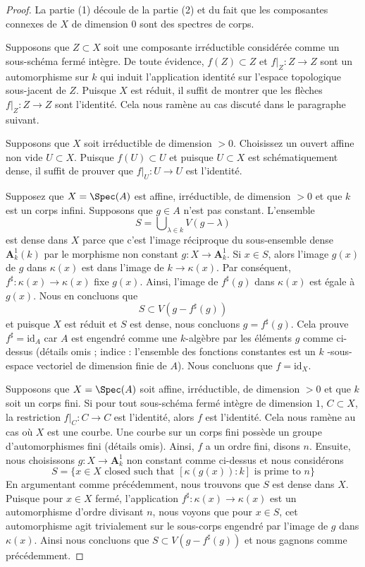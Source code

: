 \begin{proof}
La partie (1) découle de la partie (2) et du fait que les
composantes connexes de $X$ de dimension $0$ sont des spectres de corps.

\medskip\noindent
Supposons que $Z \subset X$ soit une composante irréductible considérée
comme un sous-schéma fermé intègre. De toute évidence, $f(Z) \subset Z$
et $f|_Z : Z \to Z$ sont un automorphisme sur $k$ qui induit
l'application identité sur l'espace topologique sous-jacent de $Z$.
Puisque $X$ est réduit, il suffit de montrer que les flèches $f|_Z : Z \to Z$
sont l'identité. Cela nous ramène au cas discuté dans le paragraphe suivant.

\medskip\noindent
Supposons que $X$ soit irréductible de dimension $> 0$.
Choisissez un ouvert affine non vide $U \subset X$. Puisque
$f(U) \subset U$ et puisque $U \subset X$ est schématiquement
dense, il suffit de prouver que $f|_U : U \to U$ est l'identité.

\medskip\noindent
Supposez que $X = \Spec(A)$ est affine, irréductible, de dimension $> 0$ et que
$k$ est un corps infini. Supposons que $g \in A$ n'est pas constant. L'ensemble
$$
S = \bigcup\nolimits_{\lambda \in k} V(g - \lambda)
$$
est dense dans $X$ parce que c'est l'image réciproque du
sous-ensemble dense $\mathbf{A}^1_k(k)$ par le morphisme
non constant $g : X \to \mathbf{A}^1_k$. Si $x \in S$,
alors l'image $g(x)$ de $g$ dans $\kappa(x)$ est dans
l'image de $k \to \kappa(x)$. Par conséquent, $f^\sharp :
\kappa(x) \to \kappa(x)$ fixe $g(x)$. Ainsi, l'image de
$f^\sharp(g)$ dans $\kappa(x)$ est égale à $g(x)$. Nous en concluons que
$$
S \subset V(g - f^\sharp(g))
$$
et puisque $X$ est réduit et $S$ est dense, nous concluons
$g=f^\sharp(g)$. Cela prouve $f^\sharp = \text{id}_A$ car $A$ est
engendré comme une $k$-algèbre par les éléments $g$ comme ci-dessus (détails
omis ; indice : l'ensemble des fonctions constantes est un $k$ -sous-espace
vectoriel de dimension finie de $A$). Nous concluons que $f = \text{id}_X$.

\medskip\noindent
Supposons que $X = \Spec(A)$ soit affine, irréductible, de
dimension $> 0$ et que $k$ soit un corps fini. Si pour tout
sous-schéma fermé intègre de dimension $1$, $C \subset X$, la
restriction $f|_C : C \to C$ est l'identité, alors $f$ est
l'identité. Cela nous ramène au cas où $X$ est une courbe. Une courbe
sur un corps fini possède un groupe d'automorphismes fini (détails
omis). Ainsi, $f$ a un ordre fini, disons $n$. Ensuite, nous choisissons
$g : X \to \mathbf{A}^1_k$ non constant comme ci-dessus et nous considérons
$$
S = \{x \in X\text{ closed such that }[\kappa(g(x)) : k]
\text{ is prime to }n\}
$$
En argumentant comme précédemment, nous trouvons que
$S$ est dense dans $X$. Puisque pour $x \in X$ fermé,
l'application $f^\sharp : \kappa(x) \to \kappa(x)$
est un automorphisme d'ordre divisant $n$, nous
voyons que pour $x \in S$, cet automorphisme agit
trivialement sur le sous-corps engendré par l'image de
$g$ dans $\kappa(x)$. Ainsi nous concluons que $S \subset
V(g - f^\sharp(g))$ et nous gagnons comme précédemment.
\end{proof}






